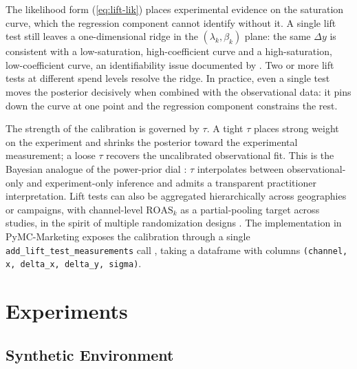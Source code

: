\documentclass{uai2026} %
\newcommand{\ROAS}{\mathrm{ROAS}}
\begin{document}
The likelihood form (\ref{eq:lift-lik}) places experimental evidence on the saturation curve, which the regression component cannot identify without it.
A single lift test still leaves a one-dimensional ridge in the $(\lambda_k, \beta_k)$ plane: the same $\Delta y$ is consistent with a low-saturation, high-coefficient curve and a high-saturation, low-coefficient curve, an identifiability issue documented by \citet{vincent2026liftasymptote}.
Two or more lift tests at different spend levels resolve the ridge.
In practice, even a single test moves the posterior decisively when combined with the observational data: it pins down the curve at one point and the regression component constrains the rest.

The strength of the calibration is governed by $\tau$.
A tight $\tau$ places strong weight on the experiment and shrinks the posterior toward the experimental measurement; a loose $\tau$ recovers the uncalibrated observational fit.
This is the Bayesian analogue of the power-prior dial \citep{ibrahim2000power}: $\tau$ interpolates between observational-only and experiment-only inference and admits a transparent practitioner interpretation.
Lift tests can also be aggregated hierarchically across geographies or campaigns, with channel-level $\ROAS_k$ as a partial-pooling target across studies, in the spirit of multiple randomization designs \citep{masoero2025multiple}.
The implementation in PyMC-Marketing exposes the calibration through a single \texttt{add\_lift\_test\_measurements} call \citep{pymcmarketing2024}, taking a dataframe with columns \texttt{(channel, x, delta\_x, delta\_y, sigma)}.

\section{Experiments}\label{sec:experiments}

\subsection{Synthetic Environment}\label{sec:synth}
\end{document}
